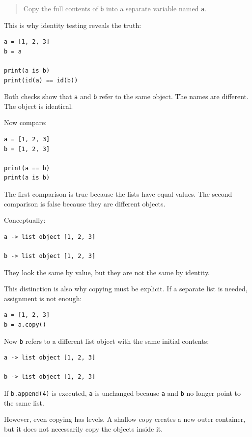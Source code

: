 \begin{quote}
Copy the full contents of \texttt{b} into a separate variable named \texttt{a}.
\end{quote}

This is why identity testing reveals the truth:

\begin{verbatim}
a = [1, 2, 3]
b = a

print(a is b)
print(id(a) == id(b))
\end{verbatim}

Both checks show that \texttt{a} and \texttt{b} refer to the same object. The names are different. The object is identical.

Now compare:

\begin{verbatim}
a = [1, 2, 3]
b = [1, 2, 3]

print(a == b)
print(a is b)
\end{verbatim}

The first comparison is true because the lists have equal values. The second comparison is false because they are different objects.

Conceptually:

\begin{verbatim}
a -> list object [1, 2, 3]

b -> list object [1, 2, 3]
\end{verbatim}

They look the same by value, but they are not the same by identity.

This distinction is also why copying must be explicit. If a separate list is needed, assignment is not enough:

\begin{verbatim}
a = [1, 2, 3]
b = a.copy()
\end{verbatim}

Now \texttt{b} refers to a different list object with the same initial contents:

\begin{verbatim}
a -> list object [1, 2, 3]

b -> list object [1, 2, 3]
\end{verbatim}

If \texttt{b.append(4)} is executed, \texttt{a} is unchanged because \texttt{a} and \texttt{b} no longer point to the same list.

However, even copying has levels. A shallow copy creates a new outer container, but it does not necessarily copy the objects inside it.

